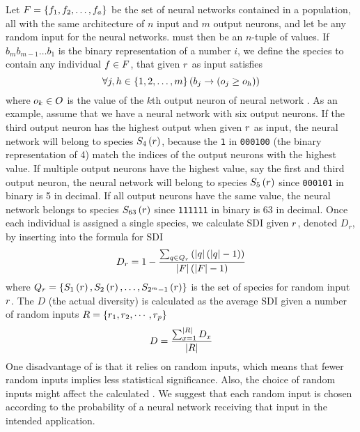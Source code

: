 Let $F = \left\{ f_1, f_2, \dots, f_a \right\}$ be the set of neural networks contained in a population, all with the same architecture of $n$ input and $m$ output neurons, and let \ran{} be any random input for the neural networks. \ran{} must then be an $n$-tuple of values. If $b_{m}b_{m-1}\dots b_1$ is the binary representation of a number $i$, we define the species  to contain any individual $f \in F$, that given $r$ as input satisfies
%
\begin{equation}\label{eq:nntdbucket}
  \forall j, h \in \left\{ 1, 2, \dots, m \right\} \left(b_j \rightarrow \left(o_j \geq o_h\right)\right)
\end{equation}
%
where $o_k \in O$ is the value of the $k$th output neuron of neural network \ind. As an example, assume that we have a neural network with six output neurons. If the third output neuron has the highest output when given $r$ as input, the neural network will belong to species $S_{4}\left(r\right)$, because the \texttt{1} in \texttt{000100} (the binary representation of 4) match the indices of the output neurons with the highest value. If multiple output neurons have the highest value, say the first and third output neuron, the neural network will belong to species $S_{5}\left(r\right)$ since \texttt{000101} in binary is 5 in decimal. If all output neurons have the same value, the neural network belongs to species $S_{63}\left(r\right)$ since \texttt{111111} in binary is 63 in decimal.
Once each individual is assigned a single species, we calculate SDI given $r$, denoted $D_r$, by inserting into the formula for SDI\cite{Venturi2007182}
%
\begin{equation}\label{eq:nntd}
  D_r = 1 - \frac{\sum_{q \in Q_{r}}\left(\lvert q\rvert\left(\lvert q\rvert - 1\right)\right)}{\lvert F\rvert\left(\lvert F\rvert - 1\right)}
\end{equation}
%
where $Q_r = \left\{ S_{1}\left(r\right), S_{2}\left(r\right), \dots, S_{2^{m}-1}\left(r\right) \right\}$ is the set of species for random input $r$. The \dia{} $D$ (the actual diversity) is calculated as the average SDI given a number of random inputs $R = \left\{ r_1, r_2, \cdots, r_p \right\}$
%
\begin{equation}\label{eq:nntdavg}
  D =\frac{\sum_{x=1}^{\lvert R\rvert}{D_x}}{\lvert R\rvert}
\end{equation}
%
One disadvantage of \dia{} is that it relies on random inputs, which means that fewer random inputs implies less statistical significance. Also, the choice of random inputs might affect the calculated \dia. We suggest that each random input is chosen according to the probability of a neural network receiving that input in the intended application. 
